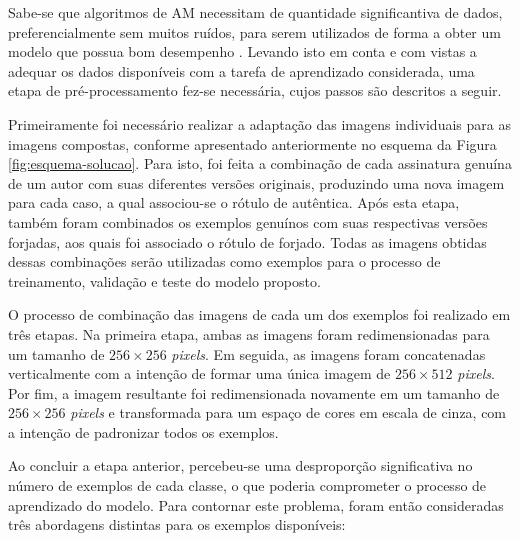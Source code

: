 
Sabe-se que algoritmos de AM necessitam de quantidade significantiva de dados, preferencialmente sem muitos ruídos, para serem utilizados de forma a obter um modelo que possua bom desempenho \cite{marsland}. Levando isto em conta e com vistas a adequar os dados disponíveis com a tarefa de aprendizado considerada, uma etapa de pré-processamento fez-se necessária, cujos passos são descritos a seguir.

Primeiramente foi necessário realizar a adaptação das imagens individuais para as imagens compostas, conforme apresentado anteriormente no esquema da Figura \ref{fig:esquema-solucao}. Para isto, foi feita a combinação de cada assinatura genuína de um autor com suas diferentes versões originais, produzindo uma nova imagem para cada caso, a qual associou-se o rótulo de autêntica. Após esta etapa, também foram combinados os exemplos genuínos com suas respectivas versões forjadas, aos quais foi associado o rótulo de forjado. Todas as imagens obtidas dessas combinações serão utilizadas como exemplos para o processo de treinamento, validação e teste do modelo proposto.

O processo de combinação das imagens de cada um dos exemplos foi realizado em três etapas. Na primeira etapa, ambas as imagens foram redimensionadas para um tamanho de $256 \times 256$ \emph{pixels}. Em seguida, as imagens foram concatenadas verticalmente com a intenção de formar uma única imagem de $256 \times 512$ \emph{pixels}. Por fim, a imagem resultante foi redimensionada novamente em um tamanho de $256 \times 256$ \emph{pixels} e transformada para um espaço de cores em escala de cinza, com a intenção de padronizar todos os exemplos.


Ao concluir a etapa anterior, percebeu-se uma desproporção significativa no número de exemplos de cada classe, o que poderia comprometer o processo de aprendizado do modelo. Para contornar este problema, foram então consideradas três abordagens distintas para os exemplos disponíveis:

